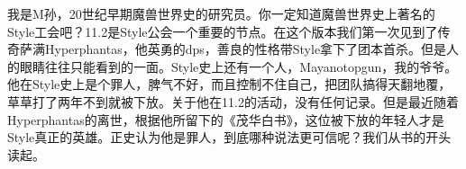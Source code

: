

我是M孙，20世纪早期魔兽世界史的研究员。你一定知道魔兽世界史上著名的Style工会吧？11.2是Style公会一个重要的节点。在这个版本我们第一次见到了传奇萨满Hyperphantas，他英勇的dps，善良的性格带Style拿下了团本首杀。但是人的眼睛往往只能看到的一面。Style史上还有一个人，Mayanotopgun，我的爷爷。他在Style史上是个罪人，脾气不好，而且控制不住自己，把团队搞得天翻地覆，草草打了两年不到就被下放。关于他在11.2的活动，没有任何记录。但是最近随着Hyperphantas的离世，根据他所留下的《茂华白书》，这位被下放的年轻人才是Style真正的英雄。正史认为他是罪人，到底哪种说法更可信呢？我们从书的开头读起。
